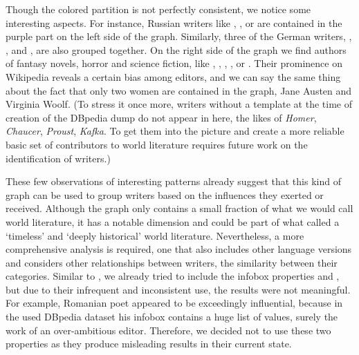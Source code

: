 \documentclass[a4paper,12pt]{scrartcl}
\begin{document}
Though the colored partition is not perfectly consistent, we notice
some interesting aspects. For instance, Russian writers like
, , or  are contained
in the purple part on the left side of the graph.
%
Similarly, three of the German writers, , , and , are also grouped together.
%
%
On the right side of the graph we find authors of fantasy novels, horror
and science fiction, like ,
, , ,
or . Their prominence on Wikipedia reveals a certain
bias among editors, and we can say the same thing about the fact
that only two women are contained in the graph, Jane Austen and Virginia
Woolf.  (To stress it once more, writers without a 
template at the time of creation of the DBpedia dump do not appear in
here, the likes of \emph{Homer}, \emph{Chaucer}, \emph{Proust},
\emph{Kafka}. To get them into the picture and create a more reliable
basic set of contributors to world literature requires future work on
the identification of writers.)

%

These few observations of interesting patterns already suggest that
this kind of graph can be used to group writers based on the
influences they exerted or received. Although the graph only contains
a small fraction of what we would call world literature, it has a
notable dimension and could be part of what \cite{levine2013what}
called a `timeless' and `deeply historical' world literature.
Nevertheless, a more comprehensive analysis is required, one that also
includes other language versions and considers other relationships
between writers, \eg the similarity between their categories.
%
Similar to \cite{athenikos2009philosophers}, we already tried to
include the  infobox properties  and
, but due to their infrequent and inconsistent
use, the results were not meaningful. For example, Romanian poet
 appeared to be exceedingly influential,
because in the used DBpedia dataset his infobox contains a huge list
of  values, surely the work of an over-ambitious
editor.
%
%
Therefore, we decided not to use these two properties as they produce
misleading results in their current state.
\end{document}
